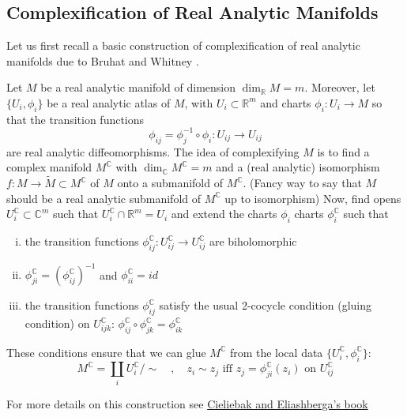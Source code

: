 \documentclass[a4paper,11pt]{article}
\theoremstyle{definition}
\newcommand{\RR}{\mathbb{R}}
\newcommand{\CC}{\mathbb{C}}
\begin{document}
\subsection{Complexification of Real Analytic Manifolds}
Let us first recall a basic construction of complexification of real analytic manifolds due to Bruhat and Whitney \cite{Bruhat_Whitney}.

Let $M$ be a real analytic manifold of dimension $\dim_{\RR} M = m$.
Moreover, let $\{ U_i, \phi_i \}$ be a real analytic atlas of $M$, with $U_i \subset \RR^m$ and charts $\phi_i \colon U_i \to M$ so that the transition functions
\begin{equation}
  \phi_{ij} = \phi_j^{-1} \circ \phi_i \colon U_{ij} \to U_{ij}
\end{equation}
are real analytic diffeomorphisms.
The idea of complexifying $M$ is to find a complex manifold $M^{\CC}$ with $\dim_{\CC} M^{\CC} = m$ and a (real analytic) isomorphism $f\colon M \to \tilde M \subset M^{\CC}$ of $M$ onto a submanifold of $M^{\CC}$. 
(Fancy way to say that $M$ should be a real analytic submanifold of $M^{\CC}$ up to isomorphism)
Now, find opens $U_i^{\CC} \subset \CC^m$ such that $U_i^{\CC} \cap \RR^m = U_i$ and extend the charts $\phi_i$ charts $\phi_i^{\CC}$ such that 
\begin{enumerate}[(i)]
  \item the transition functions $\phi^{\CC}_{ij} \colon U^{\CC}_{ij} \to U^{\CC}_{ij}$ are biholomorphic

  \item $\phi^{\CC}_{ji} = \left( \phi^{\CC}_{ij} \right)^{-1}$ and $\phi^{\CC}_{ii} = id$

  \item the transition functions $\phi^{\CC}_{ij}$ satisfy the usual 2-cocycle condition (gluing condition) on $U^{\CC}_{ijk}$: $\phi^{\CC}_{ij}\circ\phi^{\CC}_{jk} = \phi^{\CC}_{ik}$
\end{enumerate}
These conditions ensure that we can glue $M^{\CC}$ from the local data $\{ U_i^{\CC}, \phi_i^{\CC} \}$:
\begin{equation}
  M^{\CC} = \coprod_i U_i^{\CC} / \sim \quad , \quad z_i \sim z_j \text{~iff~} z_j = \phi^{\CC}_{ji}(z_i) \text{~on~} U^{\CC}_{ij}
\end{equation}

For more details on this construction see \href{https://books.google.ca/books?id=In1Dbj-pkIkC&pg=PA103\&dq=complexification+of+real+analytic+manifolds\&hl=en&sa=X\&ei=aYRAUrWeBYPZ2AWEj4DoBA\&ved=0CD8Q6AEwAQ#v=onepage\&q=complexification\%20of\%20real\%20analytic\%20manifolds&f=false}{Cieliebak and Eliashberga's book} \cite{CEbook}
\end{document}
